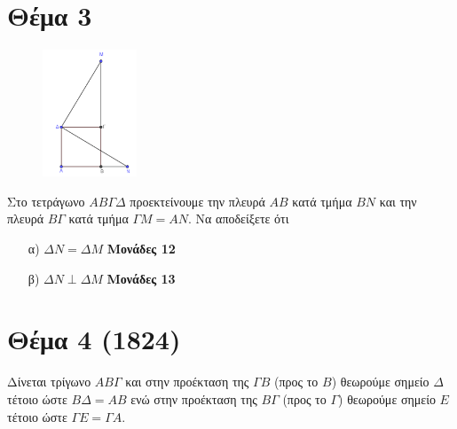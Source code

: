 \documentclass[12pt]{extarticle}
\begin{document}
\section*{Θέμα 3}
\noindent

\begin{figure}
    \centering
    \vspace{-60pt}
    \includegraphics[width=0.25\textwidth]{2023_3}
\end{figure}



\noindent
Στο τετράγωνο $ΑΒΓΔ$ προεκτείνουμε την πλευρά $ΑΒ$ κατά τμήμα $ΒΝ$ και την πλευρά $ΒΓ$ κατά τμήμα $ΓΜ=ΑΝ$. Να αποδείξετε ότι
\begin{enumerate}
    \item[α)] $ΔΝ=ΔΜ$ \hspace*{\fill} \textbf{Μονάδες 12}
    \item[β)] $ΔΝ\perp ΔΜ$ \hspace*{\fill} \textbf{Μονάδες 13}
\end{enumerate}


\hfill \break
\section*{Θέμα 4 (1824)}
\noindent

Δίνεται τρίγωνο $ΑΒΓ$ και στην προέκταση της $ΓΒ$ (προς το $Β$) θεωρούμε σημείο $Δ$ τέτοιο ώστε $ΒΔ=ΑΒ$ ενώ στην προέκταση της $ΒΓ$ (προς το $Γ$) θεωρούμε σημείο $Ε$ τέτοιο ώστε $ΓΕ=ΓΑ$.
\end{document}
